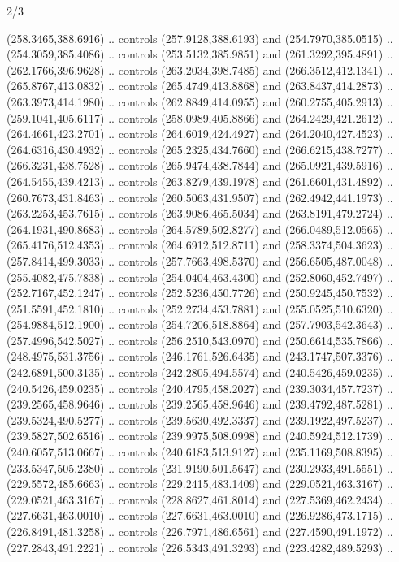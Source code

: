 \begin{flagdescription}{2/3}
\begin{scope}[shift={(0.5\flaglength,0.5)},scale=\flagwidth/545]
\begin{scope}[y=0.80pt, x=0.80pt, yscale=-1,shift={(-297,-430)}]
\begin{scope}[shift={(28.51887,-25.61095)}]
  (258.3465,388.6916) .. controls (257.9128,388.6193) and (254.7970,385.0515) ..
  (254.3059,385.4086) .. controls (253.5132,385.9851) and (261.3292,395.4891) ..
  (262.1766,396.9628) .. controls (263.2034,398.7485) and (266.3512,412.1341) ..
  (265.8767,413.0832) .. controls (265.4749,413.8868) and (263.8437,414.2873) ..
  (263.3973,414.1980) .. controls (262.8849,414.0955) and (260.2755,405.2913) ..
  (259.1041,405.6117) .. controls (258.0989,405.8866) and (264.2429,421.2612) ..
  (264.4661,423.2701) .. controls (264.6019,424.4927) and (264.2040,427.4523) ..
  (264.6316,430.4932) .. controls (265.2325,434.7660) and (266.6215,438.7277) ..
  (266.3231,438.7528) .. controls (265.9474,438.7844) and (265.0921,439.5916) ..
  (264.5455,439.4213) .. controls (263.8279,439.1978) and (261.6601,431.4892) ..
  (260.7673,431.8463) .. controls (260.5063,431.9507) and (262.4942,441.1973) ..
  (263.2253,453.7615) .. controls (263.9086,465.5034) and (263.8191,479.2724) ..
  (264.1931,490.8683) .. controls (264.5789,502.8277) and (266.0489,512.0565) ..
  (265.4176,512.4353) .. controls (264.6912,512.8711) and (258.3374,504.3623) ..
  (257.8414,499.3033) .. controls (257.7663,498.5370) and (256.6505,487.0048) ..
  (255.4082,475.7838) .. controls (254.0404,463.4300) and (252.8060,452.7497) ..
  (252.7167,452.1247) .. controls (252.5236,450.7726) and (250.9245,450.7532) ..
  (251.5591,452.1810) .. controls (252.2734,453.7881) and (255.0525,510.6320) ..
  (254.9884,512.1900) .. controls (254.7206,518.8864) and (257.7903,542.3643) ..
  (257.4996,542.5027) .. controls (256.2510,543.0970) and (250.6614,535.7866) ..
  (248.4975,531.3756) .. controls (246.1761,526.6435) and (243.1747,507.3376) ..
  (242.6891,500.3135) .. controls (242.2805,494.5574) and (240.5426,459.0235) ..
  (240.5426,459.0235) .. controls (240.4795,458.2027) and (239.3034,457.7237) ..
  (239.2565,458.9646) .. controls (239.2565,458.9646) and (239.4792,487.5281) ..
  (239.5324,490.5277) .. controls (239.5630,492.3337) and (239.1922,497.5237) ..
  (239.5827,502.6516) .. controls (239.9975,508.0998) and (240.5924,512.1739) ..
  (240.6057,513.0667) .. controls (240.6183,513.9127) and (235.1169,508.8395) ..
  (233.5347,505.2380) .. controls (231.9190,501.5647) and (230.2933,491.5551) ..
  (229.5572,485.6663) .. controls (229.2415,483.1409) and (229.0521,463.3167) ..
  (229.0521,463.3167) .. controls (228.8627,461.8014) and (227.5369,462.2434) ..
  (227.6631,463.0010) .. controls (227.6631,463.0010) and (226.9286,473.1715) ..
  (226.8491,481.3258) .. controls (226.7971,486.6561) and (227.4590,491.1972) ..
  (227.2843,491.2221) .. controls (226.5343,491.3293) and (223.4282,489.5293) ..

\end{scope}
\end{scope}
\end{scope}
\end{flagdescription}
